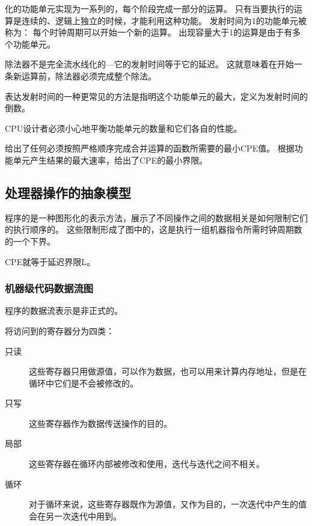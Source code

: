 {{        化的功能单元实现为一系列的，每个阶段完成一部分的运算。
        只有当要执行的运算是连续的、逻辑上独立的时候，才能利用这种功能。
        发射时间为1的功能单元被称为：
        每个时钟周期可以开始一个新的运算。
        出现容量大于1的运算是由于有多个功能单元。

        除法器不是完全流水线化的---它的发射时间等于它的延迟。
        这就意味着在开始一条新运算前，除法器必须完成整个除法。

        表达发射时间的一种更常见的方法是指明这个功能单元的最大，定义为发射时间的倒数。

        CPU设计者必须小心地平衡功能单元的数量和它们各自的性能。

        给出了任何必须按照严格顺序完成合并运算的函数所需要的最小CPE值。
        根据功能单元产生结果的最大速率，给出了CPE的最小界限。
    }

    \subsection{处理器操作的抽象模型}
    {
        程序的是一种图形化的表示方法，展示了不同操作之间的数据相关是如何限制它们的执行顺序的。
        这些限制形成了图中的，这是执行一组机器指令所需时钟周期数的一个下界。

        CPE就等于延迟界限L。

        \subsubsection{机器级代码数据流图}
        {
            程序的数据流表示是非正式的。

            将访问到的寄存器分为四类：

            \begin{description}
                \item[只读] 这些寄存器只用做源值，可以作为数据，也可以用来计算内存地址，但是在循环中它们是不会被修改的。
                \item[只写] 这些寄存器作为数据传送操作的目的。
                \item[局部] 这些寄存器在循环内部被修改和使用，迭代与迭代之间不相关。
                \item[循环] 对于循环来说，这些寄存器既作为源值，又作为目的，一次迭代中产生的值会在另一次迭代中用到。
            \end{description}

}}}
